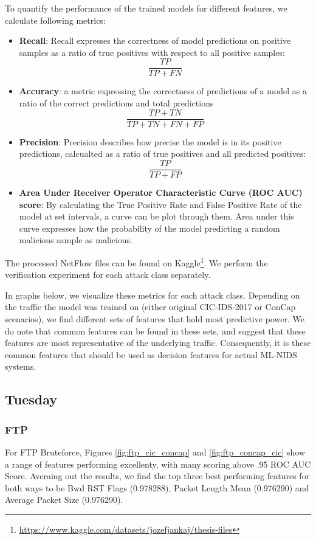 To quantify the performance of the trained models for different features, we calculate following metrics:

\begin{itemize}
	\item \textbf{Recall}: Recall expresses the correctness of model predictions on positive samples as a ratio of true positives with respect to all positive samples: $$ \frac{TP}{TP+FN} $$
	\item \textbf{Accuracy}: a metric expressing the correctness of predictions of a model as a ratio of the correct predictions and total predictions $$\frac{TP + TN}{TP + TN + FN + FP} $$
	\item \textbf{Precision}: Precision describes how precise the model is in its positive predictions, calcualted as a ratio of true positives and all predicted positives: $$ \frac{TP}{TP+FP} $$
	\item \textbf{Area Under Receiver Operator Characteristic Curve (ROC AUC) score}: By calculating the True Positive Rate and False Positive Rate of the model at set intervals, a curve can be plot through them. Area under this curve expresses how the probability of the model predicting a random malicious sample as malicious. 
	
\end{itemize}

The processed NetFlow files can be found on Kaggle\footnote{\url{https://www.kaggle.com/datasets/jozefjankaj/thesis-files}}. We perform the verification experiment for each attack class separately. 

In graphs below, we visualize these metrics for each attack class. Depending on the traffic the model was trained on (either original CIC-IDS-2017 or ConCap scenarios), we find different sets of features that hold most predictive power. We do note that common features can be found in these sets, and suggest that these features are most representative of the underlying traffic. Consequently, it is these common features that should be used as decision features for actual ML-NIDS systems.

\subsection{Tuesday}
\subsubsection{FTP}
For FTP Bruteforce, Figures \ref{fig:ftp_cic_concap} and \ref{fig:ftp_concap_cic} show a range of features performing excellenty, with many scoring above .95 ROC AUC Score. Averaing out the results, we find the top three best performing features for both ways to be Bwd RST Flags (0.978288), Packet Length Mean (0.976290) and Average Packet Size (0.976290).

